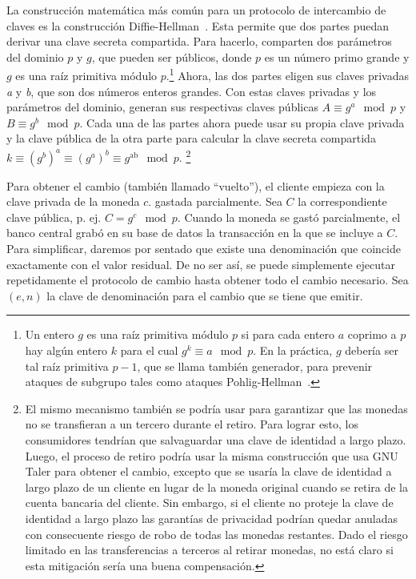 \documentclass[a4paper,10pt]{article} %
\begin{document}
La construcción matemática más común para un protocolo de intercambio de
claves es la construcción Diffie-Hellman~\cite{Diffie}. Esta
permite que dos partes puedan derivar una clave secreta compartida. Para
hacerlo, comparten dos parámetros del dominio $p$ y $g$, que
pueden ser públicos, donde $p$ es un número primo grande y $g$
es una raíz primitiva módulo $p$.\footnote{Un entero $g$ es una raíz
primitiva módulo $p$ si para cada entero $a$ coprimo a $p$ hay
algún entero $k$ para el cual
$g^k \equiv a \mod p$.
En la práctica, $g$ debería ser tal raíz primitiva $p-1$, que se
llama también generador, para prevenir ataques de subgrupo tales como ataques
Pohlig-Hellman~\cite[véase][]{Lim}.} Ahora, las dos partes eligen sus claves
privadas \emph{a} y \emph{b}, que son dos números enteros grandes. Con estas claves
privadas y los parámetros del dominio, generan sus respectivas claves
públicas $A \equiv g^{a} \mod p$ y $B \equiv g^{b} \mod p$.
Cada una de las partes ahora puede usar su propia clave privada y la
clave pública de la otra parte para calcular la clave secreta compartida
$k \equiv \left( g^b \right)^{a} \equiv \left( g^{a} \right)^{b} \equiv g^{\text{ab}} \mod p$.
\footnote{El mismo mecanismo también se podría usar para garantizar que
las monedas no se transfieran a un tercero durante el retiro. Para
lograr esto, los consumidores tendrían que salvaguardar una clave de
identidad a largo plazo. Luego, el proceso de retiro podría usar la
misma construcción que usa GNU Taler para obtener el cambio, excepto
que se usaría la clave de identidad a largo plazo de un cliente en
lugar de la moneda original cuando se retira de la cuenta bancaria del
cliente. Sin embargo, si el cliente no proteje la clave de identidad a
largo plazo las garantías de privacidad podrían quedar anuladas con
consecuente riesgo de robo de todas las monedas restantes. Dado el
riesgo limitado en las transferencias a terceros al retirar monedas,
no está claro si esta mitigación sería una buena compensación.}

Para obtener el cambio (también llamado ``vuelto''), el cliente empieza
con la clave privada de la moneda $c$. gastada parcialmente. Sea $C$ la
correspondiente clave pública, p. ej.
$C = g^{c} \mod p$.
Cuando la moneda se gastó parcialmente, el banco central grabó en su base de
datos la transacción en la que se incluye a $C$. Para simplificar, daremos
por sentado que existe una denominación que coincide exactamente con el
valor residual. De no ser así, se puede simplemente ejecutar
repetidamente el protocolo de cambio hasta obtener todo el cambio
necesario. Sea $(e,n)$ la clave de denominación para el
cambio que se tiene que emitir.
\end{document}
